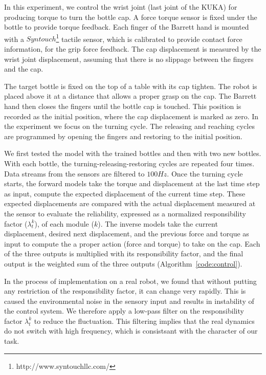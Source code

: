 In this experiment, we control the wrist joint (last joint of the KUKA)
for producing torque to turn the bottle cap. A force torque sensor is
fixed under the bottle to provide torque feedback. Each finger of the
Barrett hand is mounted with a
$Syntouch$\footnote{http://www.syntouchllc.com/} tactile sensor, which
is calibrated to provide contact force information, for the grip force
feedback. The cap displacement is measured by the wrist joint
displacement, assuming that there is no slippage between the fingers and
the cap. 

The target bottle is fixed on the top of a table with its cap
tighten. The robot is placed above it at a distance that allows a
proper grasp on the cap. The Barrett hand then closes the fingers until
the bottle cap is touched. This position is recorded as the initial
position, where the cap displacement is marked as zero. In the
experiment we focus on the turning cycle. The releasing and reaching
cycles are programmed by opening the fingers and restoring to the
initial position.

We first tested the model with the trained bottles and then with two
new bottles. With each bottle, the turning-releasing-restoring cycles
are repeated four times. Data streams from the sensors are filtered to
$100Hz$. Once the turning cycle starts, the forward models take the
torque and displacement at the last time step as input, compute the
expected displacement of the current time step. These expected
displacements are compared with the actual displacement measured at
the sensor to evaluate the reliability, expressed as a normalized
responsibility factor ($\lambda_t^k$), of each module ($k$). The inverse models
take the current displacement, desired next displacement, and the
previous force and torque as input to compute the a proper action
(force and torque) to take on the cap. Each of the three outputs is
multiplied with its responsibility factor, and the final output is the
weighted sum of the three outputs (Algorithm~\ref{code:control}).

In the process of implementation on a real robot, we found that
without putting any restriction of the responsibility factor, it can
change very rapidly. This is caused the environmental noise in the
sensory input and results in instability of the control system. We
therefore apply a low-pass filter on the responsibility factor
$\lambda_t^k$ to reduce the fluctuation. This filtering implies that
the real dynamics do not switch with high frequency, which is consistsant
with the character of our task. %


